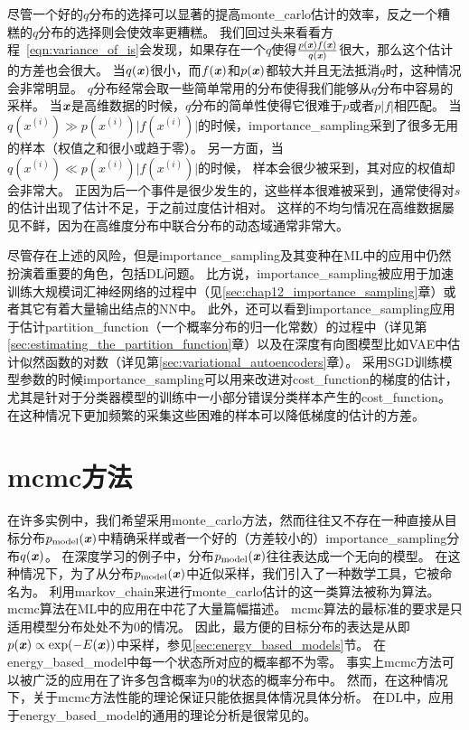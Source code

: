 尽管一个好的$q$分布的选择可以显著的提高\gls{monte_carlo}估计的效率，反之一个糟糕的$q$分布的选择则会使效率更糟糕。
我们回过头来看看方程~\eqref{eqn:variance_of_is}会发现，如果存在一个$q$使得$\frac{p(\boldsymbol{\mathit{x}})f(\boldsymbol{\mathit{x}})}{q(\boldsymbol{\mathit{x}})}$很大，那么这个估计的方差也会很大。
当$q(\boldsymbol{\mathit{x}})$很小，而$f(\boldsymbol{\mathit{x}})$和$p(\boldsymbol{\mathit{x}})$都较大并且无法抵消$q$时，这种情况会非常明显。
$q$分布经常会取一些简单常用的分布使得我们能够从$q$分布中容易的采样。
当$\boldsymbol{\mathit{x}}$是高维数据的时候，$q$分布的简单性使得它很难于$p$或者$p\vert f\vert$相匹配。
当$q(x^{(i)})\gg p(x^{(i)}) \vert f(x^{(i)})\vert $的时候，\gls{importance_sampling}采到了很多无用的样本（权值之和很小或趋于零）。
另一方面，当$q(x^{(i)})\ll p(x^{(i)}) \vert f(x^{(i)})\vert $的时候， 样本会很少被采到，其对应的权值却会非常大。
正因为后一个事件是很少发生的，这些样本很难被采到，通常使得对$s$的估计出现了估计不足，于之前过度估计相对。
这样的不均匀情况在高维数据屡见不鲜，因为在高维度分布中联合分布的动态域通常非常大。

尽管存在上述的风险，但是\gls{importance_sampling}及其变种在\gls{ML}中的应用中仍然扮演着重要的角色，包括\gls{DL}问题。
比方说，\gls{importance_sampling}被应用于加速训练大规模词汇神经网络的过程中（见\ref{sec:chap12_importance_sampling}章）或者其它有着大量输出结点的\gls{NN}中。
此外，还可以看到\gls{importance_sampling}应用于估计\gls{partition_function}（一个概率分布的归一化常数）的过程中（详见第\ref{sec:estimating_the_partition_function}章）以及在深度有向图模型比如\gls{VAE}中估计似然函数的对数（详见第\ref{sec:variational_autoencoders}章）。
采用\gls{SGD}训练模型参数的时候\gls{importance_sampling}可以用来改进对\gls{cost_function}的梯度的估计，尤其是针对于分类器模型的训练中一小部分错误分类样本产生的\gls{cost_function}。
在这种情况下更加频繁的采集这些困难的样本可以降低梯度的估计的方差\citep{Hinton06}。


\section{\gls{mcmc}方法}
\label{sec:markov_chain_monte_carlo_methods}

在许多实例中，我们希望采用\gls{monte_carlo}方法，然而往往又不存在一种直接从目标分布$p_{\text{model}}(\boldsymbol{\mathit{x}})$中精确采样或者一个好的（方差较小的）\gls{importance_sampling}分布$q(\boldsymbol{\mathit{x}})$。
在深度学习的例子中，分布$p_{\text{model}}(\boldsymbol{\mathit{x}})$往往表达成一个无向的模型。
在这种情况下，为了从分布$p_{\text{model}}(\boldsymbol{\mathit{x}})$中近似采样，我们引入了一种数学工具，它被命名为。
利用\gls{markov_chain}来进行\gls{monte_carlo}估计的这一类算法被称为算法。
\gls{mcmc}算法在\gls{ML}中的应用在\citep{koller-book2009}中花了大量篇幅描述。
\gls{mcmc}算法的最标准的要求是只适用模型分布处处不为0的情况。
因此，最方便的目标分布的表达是从即$p(\boldsymbol{\mathit{x}})\propto \exp(-E(\boldsymbol{\mathit{x}}))$中采样，参见\ref{sec:energy_based_models}节。
在\gls{energy_based_model}中每一个状态所对应的概率都不为零。
事实上\gls{mcmc}方法可以被广泛的应用在了许多包含概率为0的状态的概率分布中。
然而，在这种情况下，关于\gls{mcmc}方法性能的理论保证只能依据具体情况具体分析。
在\gls{DL}中，应用于\gls{energy_based_model}的通用的理论分析是很常见的。


